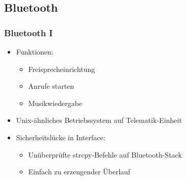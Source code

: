 \documentclass[t]{beamer}
\begin{document}






\subsection{Bluetooth} %
\begin{frame}
	\frametitle{Bluetooth I}
    \begin{itemize}
		\item Funktionen:
        \begin{itemize}
			\item Freisprecheinrichtung
            \item Anrufe starten
            \item Musikwiedergabe
		\end{itemize}
    \end{itemize}
    \begin{itemize}
		\item Unix-ähnliches Betriebssystem auf Telematik-Einheit
	\end{itemize}
    \begin{itemize}
		\item Sicherheitslücke in Interface:
		\begin{itemize}
			\item Unüberprüfte strcpy-Befehle auf Bluetooth-Stack
            \item Einfach zu erzeugender Überlauf
		\end{itemize}
	\end{itemize}
\end{frame}
\end{document}
